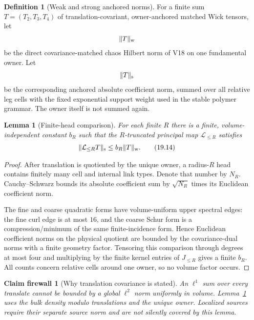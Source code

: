 \documentclass[11pt,oneside]{book}
\newtheorem{lemma}[theorem]{Lemma}
\newtheorem{firewall}[theorem]{Claim firewall}
\theoremstyle{definition}
\newtheorem{definition}[theorem]{Definition}
\theoremstyle{remark}
\begin{document}
\begin{definition}[Weak and strong anchored norms]
\label{def:e8v19-two-norms}
For a finite sum \(T=(T_2,T_3,T_4)\) of translation-covariant,
owner-anchored matched Wick tensors, let
\[
 \|T\|_{\rm w}
\]
be the direct covariance-matched chaos Hilbert norm of V18 on one
fundamental owner.  Let
\[
 \|T\|_{\rm s}
\]
be the corresponding anchored absolute coefficient norm, summed over
all relative leg cells with the fixed exponential support weight used
in the stable polymer grammar.  The owner itself is not summed again.
\end{definition}

\begin{lemma}[Finite-head comparison]
\label{lem:e8v19-head}
For each finite \(R\) there is a finite, volume-independent constant
\(b_R\) such that the \(R\)-truncated principal map
\(\mathcal L_{\leq R}\) satisfies
\[
                         \|\mathcal L_{\leq R}T\|_{\rm s}
 \leq b_R\|T\|_{\rm w}.                            \tag{19.14}
\]
\end{lemma}

\begin{proof}
After translation is quotiented by the unique owner, a radius-\(R\)
head contains finitely many cell and internal link types.  Denote that
number by \(N_R\).  Cauchy--Schwarz bounds its absolute coefficient
sum by \(\sqrt{N_R}\) times its Euclidean coefficient norm.

The fine and coarse quadratic forms have volume-uniform upper spectral
edges: the fine curl edge is at most \(16\), and the coarse Schur form
is a compression/minimum of the same finite-incidence form.  Hence
Euclidean coefficient norms on the physical quotient are bounded by
the covariance-dual norms with a finite geometry factor.  Tensoring
this comparison through degrees at most four and multiplying by the
finite kernel entries of \(J_{\leq R}\) gives a finite \(b_R\).
All counts concern relative cells around one owner, so no volume
factor occurs.
\end{proof}

\begin{firewall}[Why translation covariance is stated]
\label{fire:e8v19-translation}
An \(\ell^1\) sum over every translate cannot be bounded by a global
\(\ell^2\) norm uniformly in volume.  Lemma~\ref{lem:e8v19-head}
uses the bulk density modulo translations and the unique owner.
Localized sources require their separate source norm and are not
silently covered by this lemma.
\end{firewall}
\end{document}
